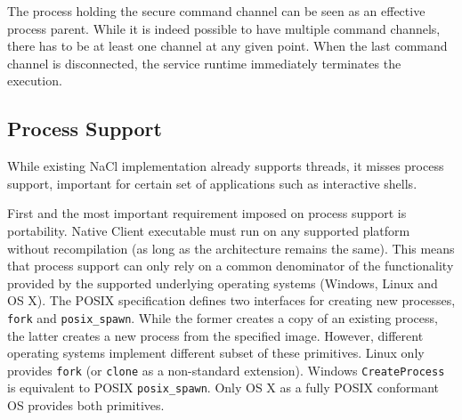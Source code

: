 The process holding the secure command channel can be seen as an
effective process parent. While it is indeed possible to have multiple
command channels, there has to be at least one channel at any given
point.  When the last command channel is disconnected, the service
runtime immediately terminates the execution.



\subsection{Process Support}
\label{sub:process_support}

While existing NaCl implementation already supports threads, it misses
process support, important for certain set of applications such as
interactive shells.  

First and the most important requirement imposed on process support is
portability. Native Client executable must run on any supported platform
without recompilation (as long as the architecture remains the same).
This means that process support can only rely on a common denominator of
the functionality provided by the supported underlying operating systems
(\ie Windows, Linux and OS X). The POSIX specification defines two
interfaces for creating new processes, \lstinline`fork` and
\lstinline`posix_spawn`. While the former creates a copy of an existing
process, the latter creates a new process from the specified image.
However, different operating systems implement different subset of these
primitives. Linux only provides \lstinline`fork` (or \lstinline`clone`
as a non-standard extension).  Windows \lstinline`CreateProcess` is
equivalent to POSIX \lstinline`posix_spawn`. Only OS X as a fully POSIX
conformant OS provides both primitives.

